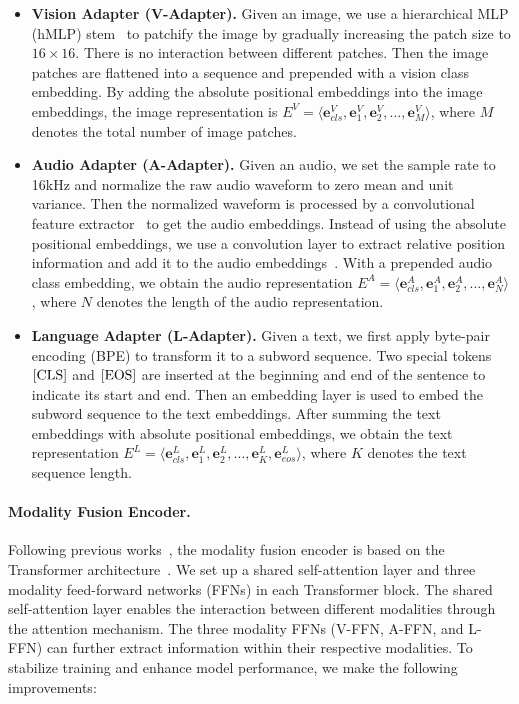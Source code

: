 \begin{itemize}
    \item \textbf{Vision Adapter (V-Adapter).} Given an image, we use a hierarchical MLP (hMLP) stem~\cite{Touvron2022ThreeTE} to patchify the image by gradually increasing the patch size to $16 \times 16$. There is no interaction between different patches. Then the image patches are flattened into a sequence and prepended with a vision class embedding. By adding the absolute positional embeddings into the image embeddings, the image representation is $E^V=\langle \bm{e}^V_{cls}, \bm{e}^V_{1}, \bm{e}^V_{2}, ..., \bm{e}^V_{M} \rangle$, where $M$ denotes the total number of image patches.
    \item \textbf{Audio Adapter (A-Adapter).} Given an audio, we set the sample rate to 16kHz and normalize the raw audio waveform to zero mean and unit variance. Then the normalized waveform is processed by a convolutional feature extractor~\cite{wav2vec2} to get the audio embeddings. Instead of using the absolute positional embeddings, we use a convolution layer to extract relative position information and add it to the audio embeddings~\cite{Mohamed2019TransformersWC}. With a prepended audio class embedding, we obtain the audio representation $E^A=\langle \bm{e}^A_{cls}, \bm{e}^A_{1}, \bm{e}^A_{2}, ..., \bm{e}^A_{N} \rangle$, where $N$ denotes the length of the audio representation.
    \item \textbf{Language Adapter (L-Adapter).} Given a text, we first apply byte-pair encoding (BPE) \cite{bpe} to transform it to a subword sequence. Two special tokens $\left[{\rm CLS}\right]$ and $\left[{\rm EOS}\right]$ are inserted at the beginning and end of the sentence to indicate its start and end. Then an embedding layer is used to embed the subword sequence to the text embeddings. After summing the text embeddings with absolute positional embeddings, we obtain the text representation $E^L=\langle \bm{e}^L_{cls}, \bm{e}^L_{1}, \bm{e}^L_{2}, ..., \bm{e}^L_{K}, \bm{e}^L_{eos} \rangle$, where $K$ denotes the text sequence length.
\end{itemize}

\paragraph{Modality Fusion Encoder.} 
Following previous works~\cite{simvlm,ofa,coca,beit3,ofasys}, the modality fusion encoder is based on the Transformer architecture~\cite{transformer}. 
We set up a shared self-attention layer and three modality feed-forward networks (FFNs) in each Transformer block.
The shared self-attention layer enables the interaction between different modalities through the attention mechanism.
The three modality FFNs (V-FFN, A-FFN, and L-FFN) can further extract information within their respective modalities.
To stabilize training and enhance model performance, we make the following improvements:

